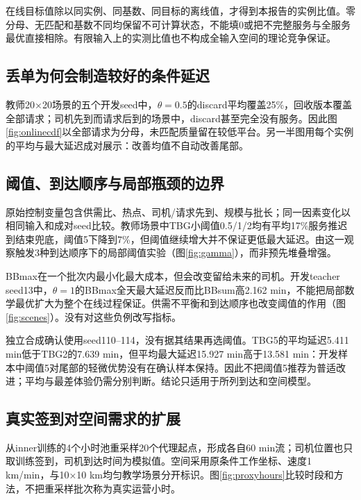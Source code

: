 在线目标值除以同实例、同基数、同目标的离线值，才得到本报告的实例比值。零分母、无匹配和基数不同均保留不可计算状态，不能填0或把不完整服务与全服务最优直接相除。有限输入上的实测比值也不构成全输入空间的理论竞争保证。

\subsection{丢单为何会制造较好的条件延迟}

教师20×20场景的五个开发seed中，$\theta=0.5$的discard平均覆盖25\%，回收版本覆盖全部请求；司机先到而请求后到的场景中，discard甚至完全没有服务。因此图\ref{fig:onlinecdf}以全部请求为分母，未匹配质量留在较低平台。另一半图用每个实例的平均与最大延迟成对展示：改善均值不自动改善尾部。


\subsection{阈值、到达顺序与局部瓶颈的边界}
原始控制变量包含供需比、热点、司机/请求先到、规模与批长；同一因素变化以相同输入和成对seed比较。教师场景中TBG小阈值0.5/1/2均有平均17\%服务推迟到结束兜底，阈值5下降到7\%，但阈值继续增大并不保证更低最大延迟。由这一观察触发3种到达顺序下的局部阈值实验（图\ref{fig:gamma}），而非预先堆叠增强。


BBmax在一个批次内最小化最大成本，但会改变留给未来的司机。开发teacher seed13中，$\theta=1$的BBmax全天最大延迟反而比BBsum高2.162 min，不能把局部数学最优扩大为整个在线过程保证。供需不平衡和到达顺序也改变阈值的作用（图\ref{fig:scenes}）。没有对这些负例改写指标。


独立合成确认使用seed110--114，没有据其结果再选阈值。TBG5的平均延迟5.411 min低于TBG2的7.639 min，但平均最大延迟15.927 min高于13.581 min：开发样本中阈值5对尾部的轻微优势没有在确认样本保持。因此不把阈值5推荐为普适改进；平均与最差体验仍需分别判断。结论只适用于所列到达和空间模型。

\subsection{真实签到对空间需求的扩展}
从inner训练的4个小时池重采样20个代理起点，形成各自60 min流；司机位置也只取训练签到，司机到达时间为模拟值。空间采用原条件工作坐标、速度1 km/min，与10×10 km均匀教学场景分开标识。图\ref{fig:proxyhours}比较时段和方法，不把重采样批次称为真实运营小时。
